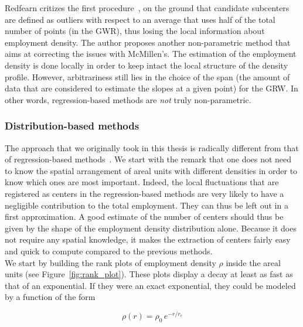 Redfearn critizes the first procedure~\cite{Redfearn:2007}, on the ground that candidate
subcenters are defined as outliers with respect to an average that uses half of the total
number of points (in the GWR), thus losing the local information about employment
density. The author proposes another non-parametric method that aims at correcting the issues
with McMillen's\cite{Redfearn:2007}. The estimation of the employment density is
done locally in order to keep intact the local structure of the density profile.
However, arbitrariness still lies in the choice of the span (the amount of data
that are considered to estimate the slopes at a given point) for the GRW. In
other words, regression-based methods are \emph{not} truly non-parametric.\\

\subsubsection{Distribution-based methods}
\label{ssub:distribution_based_methods}


The approach that we originally took in this thesis is radically different from
that of regression-based methods~\cite{Louf:2013_polycentric}. We start with the
remark that one does not need to know the spatial arrangement of areal units
with different densities in order to know which ones are most important. Indeed,
the local fluctuations that are registered as centers in the regression-based
methods are very likely to have a negligible contribution to the total
employment. They can thus be left out in a first approximation. A good estimate
of the number of centers should thus be given by the shape of the employment
density distribution alone. Because it does not require any spatial knowledge,
it makes the extraction of centers fairly easy and quick to compute compared to
the previous methods.\\

We start by building the rank plots of employment density $\rho$ inside the
areal units (see Figure~\ref{fig:rank_plot}). These plots display a decay at least as fast as that of an
exponential. If they were an exact exponential, they could be modeled by a
function of the form

\begin{equation}
    \rho(r) = \rho_0\,e^{-r/r_c}
    \label{eq:}
\end{equation}

